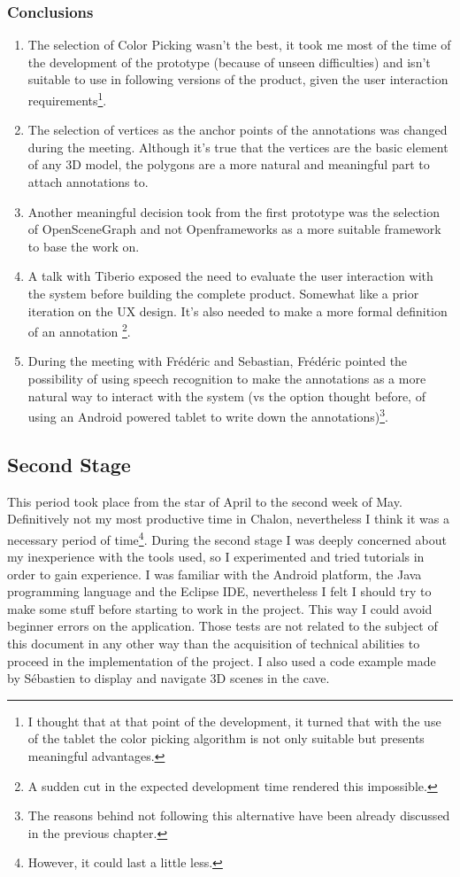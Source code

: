 \subsubsection{Conclusions}
\begin{enumerate}
	\item The selection of Color Picking wasn't the best, it took me most of the time of the development of the prototype (because of unseen difficulties) and isn't suitable to use in following versions of the product, given the user interaction requirements\footnote{I thought that at that point of the development, it turned that with the use of the tablet the color picking algorithm is not only suitable but presents meaningful advantages.}.
	\item The selection of vertices as the anchor points of the annotations was changed during the meeting. Although it's true that the vertices are the basic element of any 3D model, the polygons are a more natural and meaningful part to attach annotations to.
	\item Another meaningful decision took from the first prototype was the selection of OpenSceneGraph and not Openframeworks as a more suitable framework to base the work on.
	\item A talk with Tiberio exposed the need to evaluate the user interaction with the system before building the complete product. Somewhat like a prior iteration on the UX design. It's also needed to make a more formal definition of an annotation \footnote{A sudden cut in the expected development time rendered this impossible.}.
	\item During the meeting with Frédéric and Sebastian, Frédéric pointed the possibility of using speech recognition to make the annotations as a more natural way to interact with the system (vs the option thought before, of using an Android powered tablet to write down the annotations)\footnote{The reasons behind not following this alternative have been already discussed in the previous chapter.}.
\end{enumerate}

\subsection{Second Stage}
This period took place from the star of April to the second week of May. Definitively not my most productive time in Chalon, nevertheless I think it was a necessary period of time\footnote{However, it could last a little less.}. During the second stage I was deeply concerned about my inexperience with the tools used, so I experimented and tried tutorials in order to gain experience. I was familiar with the Android platform, the Java programming language and the Eclipse IDE, nevertheless I felt I should try to make some stuff before starting to work in the project. This way I could avoid beginner errors on the application. Those tests are not related to the subject of this document in any other way than the acquisition of technical abilities to proceed in the implementation of the project. I also used a code example made by Sébastien to display and navigate 3D scenes in the cave.


